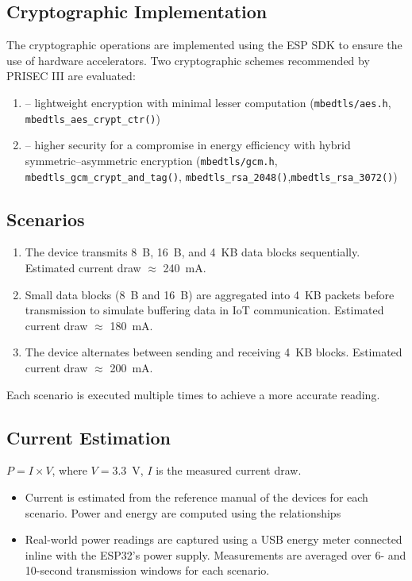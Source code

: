 \documentclass[METI_NISS]{IEEEtran}
\begin{document}
\subsection{Cryptographic Implementation}
The cryptographic operations are implemented using the ESP SDK to ensure the use of hardware accelerators. Two cryptographic schemes recommended by PRISEC III are evaluated:

\begin{enumerate}
    \item {} -- lightweight encryption with minimal lesser computation (\texttt{mbedtls/aes.h}, \texttt{mbedtls\_aes\_crypt\_ctr()})
    
    \item {} --  higher security for a compromise in energy efficiency with hybrid symmetric–asymmetric encryption (\texttt{mbedtls/gcm.h}, \texttt{mbedtls\_gcm\_crypt\_and\_tag()}, \texttt{mbedtls\_rsa\_2048()},\texttt{mbedtls\_rsa\_3072()})
\end{enumerate}

\subsection{Scenarios}
\begin{enumerate}
    \item {}  
    The device transmits 8~B, 16~B, and 4~KB data blocks sequentially. Estimated current draw $\approx$ 240~mA.
    
    \item {}  
    Small data blocks (8~B and 16~B) are aggregated into 4~KB packets before transmission to simulate buffering data in IoT communication. Estimated current draw $\approx$ 180~mA.
    
    \item {}  
    The device alternates between sending and receiving 4~KB blocks. Estimated current draw $\approx$ 200~mA.
\end{enumerate}

Each scenario is executed multiple times to achieve a more accurate reading.

\subsection{Current Estimation}
$P = I \times V$, where $V = 3.3$~V, $I$ is the measured current draw.
\begin{itemize}
    \item {}  
    Current is estimated from the reference manual of the devices for each scenario. Power and energy are computed using the relationships 
    
    
    \item {}  
    Real-world power readings are captured using a USB energy meter connected inline with the ESP32's power supply. Measurements are averaged over 6- and 10-second transmission windows for each scenario. 
\end{itemize}
\end{document}
